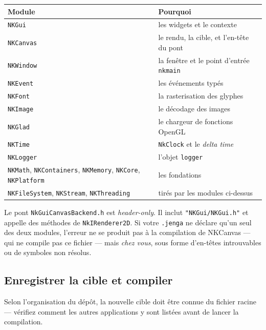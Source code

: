 \begin{center}
\begin{tabular}{@{}ll@{}}
\toprule
\textbf{Module} & \textbf{Pourquoi} \\
\midrule
\texttt{NKGui}        & les widgets et le contexte \\
\texttt{NKCanvas}     & le rendu, la cible, et l'en-tête du pont \\
\texttt{NKWindow}     & la fenêtre et le point d'entrée \texttt{nkmain} \\
\texttt{NKEvent}      & les événements typés \\
\texttt{NKFont}       & la rasterisation des glyphes \\
\texttt{NKImage}      & le décodage des images \\
\texttt{NKGlad}       & le chargeur de fonctions OpenGL \\
\texttt{NKTime}       & \texttt{NkClock} et le \emph{delta time} \\
\texttt{NKLogger}     & l'objet \texttt{logger} \\
\texttt{NKMath}, \texttt{NKContainers}, \texttt{NKMemory}, \texttt{NKCore}, \texttt{NKPlatform} & les fondations \\
\texttt{NKFileSystem}, \texttt{NKStream}, \texttt{NKThreading} & tirés par les modules ci-dessus \\
\bottomrule
\end{tabular}
\end{center}

\begin{nkpiege}
Le pont \texttt{NkGuiCanvasBackend.h} est \emph{header-only}. Il inclut
\texttt{"NKGui/NKGui.h"} et appelle des méthodes de \texttt{NkIRenderer2D}. Si
votre \texttt{.jenga} ne déclare qu'un seul des deux modules, l'erreur ne se
produit pas à la compilation de NKCanvas — qui ne compile pas ce fichier — mais
\emph{chez vous}, sous forme d'en-têtes introuvables ou de symboles non résolus.
\end{nkpiege}

\subsection{Enregistrer la cible et compiler}

Selon l'organisation du dépôt, la nouvelle cible doit être connue du fichier
racine  — vérifiez comment les autres applications y sont
listées avant de lancer la compilation.

